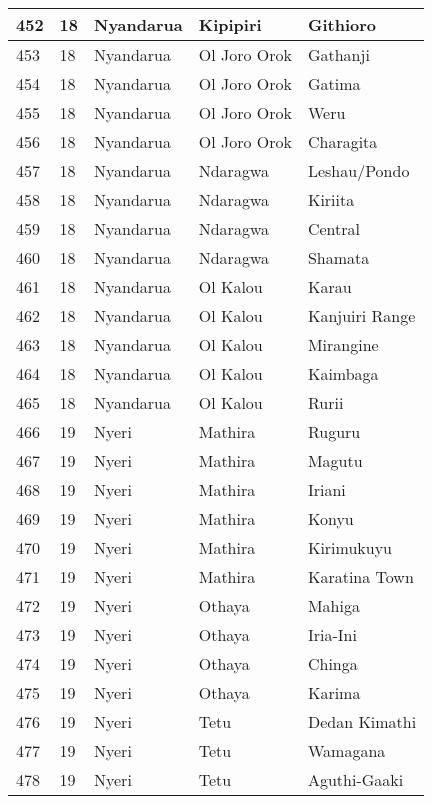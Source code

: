 \begin{table}[!ht]
\begin{tabular}{|l|l|l|l|l|}
        452 & 18 & Nyandarua & Kipipiri & Githioro \\ \hline
        453 & 18 & Nyandarua & Ol Joro Orok & Gathanji \\ \hline
        454 & 18 & Nyandarua & Ol Joro Orok & Gatima \\ \hline
        455 & 18 & Nyandarua & Ol Joro Orok & Weru \\ \hline
        456 & 18 & Nyandarua & Ol Joro Orok & Charagita \\ \hline
        457 & 18 & Nyandarua & Ndaragwa & Leshau/Pondo \\ \hline
        458 & 18 & Nyandarua & Ndaragwa & Kiriita \\ \hline
        459 & 18 & Nyandarua & Ndaragwa & Central \\ \hline
        460 & 18 & Nyandarua & Ndaragwa & Shamata \\ \hline
        461 & 18 & Nyandarua & Ol Kalou & Karau \\ \hline
        462 & 18 & Nyandarua & Ol Kalou & Kanjuiri Range \\ \hline
        463 & 18 & Nyandarua & Ol Kalou & Mirangine \\ \hline
        464 & 18 & Nyandarua & Ol Kalou & Kaimbaga \\ \hline
        465 & 18 & Nyandarua & Ol Kalou & Rurii \\ \hline
        466 & 19 & Nyeri & Mathira & Ruguru \\ \hline
        467 & 19 & Nyeri & Mathira & Magutu \\ \hline
        468 & 19 & Nyeri & Mathira & Iriani \\ \hline
        469 & 19 & Nyeri & Mathira & Konyu \\ \hline
        470 & 19 & Nyeri & Mathira & Kirimukuyu \\ \hline
        471 & 19 & Nyeri & Mathira & Karatina Town \\ \hline
        472 & 19 & Nyeri & Othaya & Mahiga \\ \hline
        473 & 19 & Nyeri & Othaya & Iria-Ini \\ \hline
        474 & 19 & Nyeri & Othaya & Chinga \\ \hline
        475 & 19 & Nyeri & Othaya & Karima \\ \hline
        476 & 19 & Nyeri & Tetu & Dedan Kimathi \\ \hline
        477 & 19 & Nyeri & Tetu & Wamagana \\ \hline
        478 & 19 & Nyeri & Tetu & Aguthi-Gaaki \\ \hline

\end{tabular}
\end{table}
